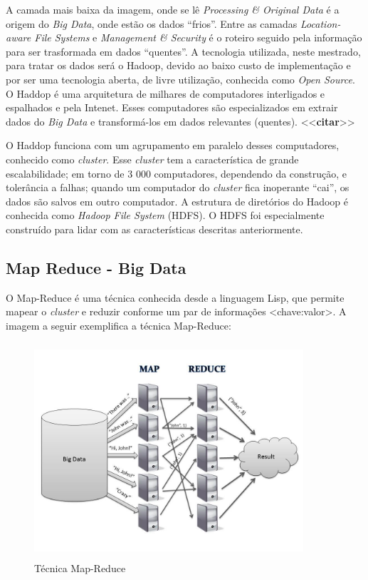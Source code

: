 \documentclass[conference,compsoc]{IEEEtran}
\begin{document}
A camada mais baixa da imagem, onde se lê \textit{Processing \& Original Data} é a origem do \textit{Big Data}, onde estão os dados ``frios''. Entre as camadas \textit{Location-aware File Systems} e \textit{Management \& Security} é o roteiro seguido pela informação para ser trasformada em dados ``quentes''. A tecnologia utilizada, neste mestrado, para tratar os dados será o Hadoop, devido ao baixo custo de implementação e por ser uma tecnologia aberta, de livre utilização, conhecida como \textit{Open Source}. O Haddop é uma arquitetura de milhares de computadores interligados e espalhados e pela Intenet. Esses computadores são especializados em extrair dados do \textit{Big Data} e transformá-los em dados relevantes (quentes). <<\textbf{citar}>>

O Haddop funciona com um agrupamento em paralelo desses computadores, conhecido como \textit{cluster}. Esse \textit{cluster} tem a característica de grande escalabilidade; em torno de 3 000 computadores, dependendo da construção, e tolerância a falhas; quando um computador do \textit{cluster} fica inoperante  ``cai'', os dados são salvos em outro computador. A estrutura de diretórios do Hadoop é conhecida como \textit{Hadoop File System} (HDFS). O HDFS foi especialmente construído para lidar com as características descritas anteriormente.



\subsection{Map Reduce - Big Data}\label{arte:palavraChave:MapReduceBigData}


O Map-Reduce é uma técnica conhecida desde a linguagem Lisp, que permite mapear o \textit{cluster} e reduzir conforme um par de informações <chave:valor>. A imagem a seguir exemplifica a técnica Map-Reduce:

\begin{figure}[ht]
\centering
\caption{Técnica Map-Reduce}
\includegraphics[width=100mm, height=80mm]{Figuras/MapReduce.jpg}
\end{figure}
\end{document}
